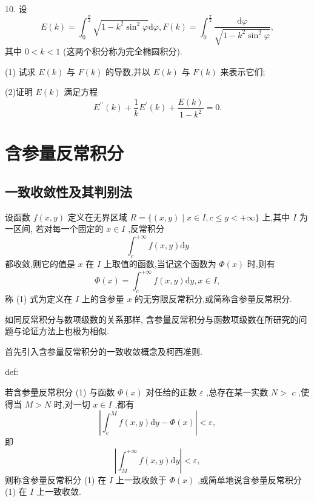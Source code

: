 10. 设
\[
E\left( k\right)  = {\int }_{0}^{\frac{\pi }{2}}\sqrt{1 - {k}^{2}{\sin }^{2}\varphi }\mathrm{d}\varphi ,F\left( k\right)  = {\int }_{0}^{\frac{\pi }{2}}\frac{\mathrm{d}\varphi }{\sqrt{1 - {k}^{2}{\sin }^{2}\varphi }},
\]
其中 \(0 < k < 1\) (这两个积分称为完全椭圆积分).

(1) 试求 \(E\left( k\right)\) 与 \(F\left( k\right)\) 的导数,并以 \(E\left( k\right)\) 与 \(F\left( k\right)\) 来表示它们;

(2)证明 \(E\left( k\right)\) 满足方程
\[
{E}^{\prime \prime }\left( k\right)  + \frac{1}{k}{E}^{\prime }\left( k\right)  + \frac{E\left( k\right) }{1 - {k}^{2}} = 0.
\]
\section{含参量反常积分}

\subsection{一致收敛性及其判别法}

设函数 \(f\left( {x,y}\right)\) 定义在无界区域 \(R = \{ \left( {x,y}\right)  \mid  x \in  I,c \leq  y <  + \infty \}\) 上,其中 \(I\) 为一区间, 若对每一个固定的 \(x \in  I\) ,反常积分
\[
{\int }_{c}^{+\infty }f\left( {x,y}\right) \mathrm{d}y \tag{1}
\]
都收敛,则它的值是 \(x\) 在 \(I\) 上取值的函数,当记这个函数为 \(\Phi \left( x\right)\) 时,则有
\[
\Phi \left( x\right)  = {\int }_{c}^{+\infty }f\left( {x,y}\right) \mathrm{d}y,x \in  I, \tag{2}
\]
称 (1) 式为定义在 \(I\) 上的含参量 \(x\) 的无穷限反常积分,或简称含参量反常积分.

如同反常积分与数项级数的关系那样, 含参量反常积分与函数项级数在所研究的问题与论证方法上也极为相似.

首先引入含参量反常积分的一致收敛概念及柯西准则.

\begin{definition}{}{def:}

\end{definition}
若含参量反常积分 (1) 与函数 \(\Phi \left( x\right)\) 对任给的正数 \(\varepsilon\) ,总存在某一实数 \(N >\)  \(c\) ,使得当 \(M > N\) 时,对一切 \(x \in  I\) ,都有
\[
\left| {{\int }_{c}^{M}f\left( {x,y}\right) \mathrm{d}y - \Phi \left( x\right) }\right|  < \varepsilon ,
\]
即
\[
\left| {{\int }_{M}^{+\infty }f\left( {x,y}\right) \mathrm{d}y}\right|  < \varepsilon ,
\]
则称含参量反常积分 (1) 在 \(I\) 上一致收敛于 \(\Phi \left( x\right)\) ,或简单地说含参量反常积分 (1) 在 \(I\) 上一致收敛.

